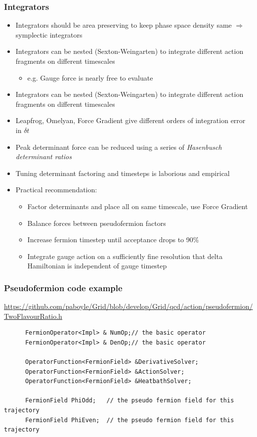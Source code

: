 \documentclass[pdf,ps,8pt]{beamer}
\newcommand{\link}[1]{\href{#1}{ {\color{blue} #1} }}
\begin{document}
\begin{frame}[fragile]\small\frametitle{ Integrators }
\begin{itemize}
\item Integrators should be area preserving to keep phase space density same $\Rightarrow$ symplectic integrators
\item Integrators can be nested (Sexton-Weingarten) to integrate different action fragments on different timescales
\begin{itemize}
\item e.g. Gauge force is nearly free to evaluate
\end{itemize}
\item Integrators can be nested (Sexton-Weingarten) to integrate different action fragments on different timescales
\item Leapfrog, Omelyan, Force Gradient give different orders of integration error in $\delta t$ 
\item Peak determinant force can be reduced using a series of \emph{Hasenbusch determinant ratios}
\item Tuning determinant factoring and timesteps is laborious and empirical
\item Practical recommendation: 
\begin{itemize}
\item Factor determinants and place all on same timescale, use Force Gradient
\item Balance forces between pseudofermion factors
\item Increase fermion timestep until acceptance drops to 90\%
\item Integrate gauge action on a sufficiently fine resolution that delta Hamiltonian is independent of gauge timestep
\end{itemize}
\end{itemize}
\end{frame}

\begin{frame}[fragile]\small\frametitle{ Pseudofermion code example }

  \link{https://github.com/paboyle/Grid/blob/develop/Grid/qcd/action/pseudofermion/TwoFlavourRatio.h}
  {  \tiny
\begin{verbatim}
      FermionOperator<Impl> & NumOp;// the basic operator
      FermionOperator<Impl> & DenOp;// the basic operator

      OperatorFunction<FermionField> &DerivativeSolver;
      OperatorFunction<FermionField> &ActionSolver;
      OperatorFunction<FermionField> &HeatbathSolver;

      FermionField PhiOdd;   // the pseudo fermion field for this trajectory
      FermionField PhiEven;  // the pseudo fermion field for this trajectory
  \end{verbatim}
    }
\end{frame}
\end{document}
